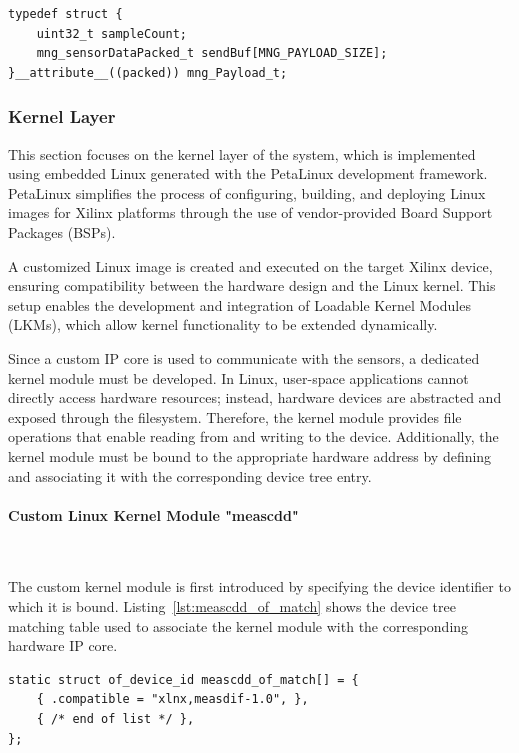 \begin{lstlisting}[caption={MNG Payload structure}, label={lst:payloadhandle}]
typedef struct {
    uint32_t sampleCount;
    mng_sensorDataPacked_t sendBuf[MNG_PAYLOAD_SIZE];
}__attribute__((packed)) mng_Payload_t;
\end{lstlisting}


\subsubsection{Kernel Layer}

This section focuses on the kernel layer of the system, which is implemented using embedded Linux generated with the PetaLinux development framework. PetaLinux simplifies the process of configuring, building, and deploying Linux images for Xilinx platforms through the use of vendor-provided Board Support Packages (BSPs).

A customized Linux image is created and executed on the target Xilinx device, ensuring compatibility between the hardware design and the Linux kernel. This setup enables the development and integration of Loadable Kernel Modules (LKMs), which allow kernel functionality to be extended dynamically.

Since a custom IP core is used to communicate with the sensors, a dedicated kernel module must be developed. In Linux, user-space applications cannot directly access hardware resources; instead, hardware devices are abstracted and exposed through the filesystem. Therefore, the kernel module provides file operations that enable reading from and writing to the device. Additionally, the kernel module must be bound to the appropriate hardware address by defining and associating it with the corresponding device tree entry.

\paragraph{Custom Linux Kernel Module "meascdd"}\

The custom kernel module is first introduced by specifying the device identifier 
to which it is bound. Listing~\ref{lst:meascdd_of_match} shows the device tree 
matching table used to associate the kernel module with the corresponding hardware 
IP core.

\begin{lstlisting}[caption={MNG Payload structure}, label={lst:meascdd_of_match}]
static struct of_device_id meascdd_of_match[] = {
	{ .compatible = "xlnx,measdif-1.0", },
	{ /* end of list */ },
};
\end{lstlisting}

